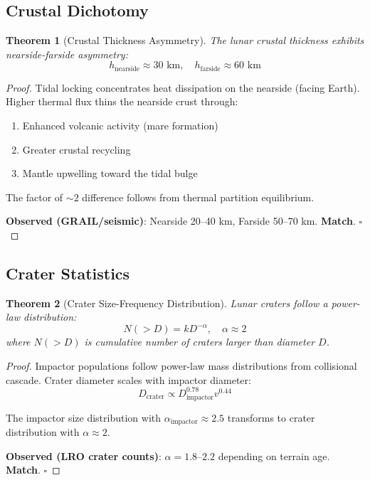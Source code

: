 \documentclass[twocolumn,10pt]{article}
\newtheorem{theorem}{Theorem}[section]
\theoremstyle{definition}
\theoremstyle{remark}
\begin{document}
\subsection{Crustal Dichotomy}

\begin{theorem}[Crustal Thickness Asymmetry]
\label{thm:dichotomy}
The lunar crustal thickness exhibits nearside-farside asymmetry:
\begin{equation}
h_{\text{nearside}} \approx 30 \text{ km}, \quad h_{\text{farside}} \approx 60 \text{ km}
\end{equation}
\end{theorem}

\begin{proof}
Tidal locking concentrates heat dissipation on the nearside (facing Earth). Higher thermal flux thins the nearside crust through:
\begin{enumerate}
    \item Enhanced volcanic activity (mare formation)
    \item Greater crustal recycling
    \item Mantle upwelling toward the tidal bulge
\end{enumerate}

The factor of $\sim 2$ difference follows from thermal partition equilibrium.

\textbf{Observed (GRAIL/seismic)}: Nearside 20--40 km, Farside 50--70 km. \textbf{Match}. $\square$
\end{proof}

\subsection{Crater Statistics}

\begin{theorem}[Crater Size-Frequency Distribution]
\label{thm:crater_sfd}
Lunar craters follow a power-law distribution:
\begin{equation}
N(>D) = k D^{-\alpha}, \quad \alpha \approx 2
\end{equation}
where $N(>D)$ is cumulative number of craters larger than diameter $D$.
\end{theorem}

\begin{proof}
Impactor populations follow power-law mass distributions from collisional cascade. Crater diameter scales with impactor diameter:
\begin{equation}
D_{\text{crater}} \propto D_{\text{impactor}}^{0.78} v^{0.44}
\end{equation}

The impactor size distribution with $\alpha_{\text{impactor}} \approx 2.5$ transforms to crater distribution with $\alpha \approx 2$.

\textbf{Observed (LRO crater counts)}: $\alpha = 1.8$--$2.2$ depending on terrain age. \textbf{Match}. $\square$
\end{proof}
\end{document}
